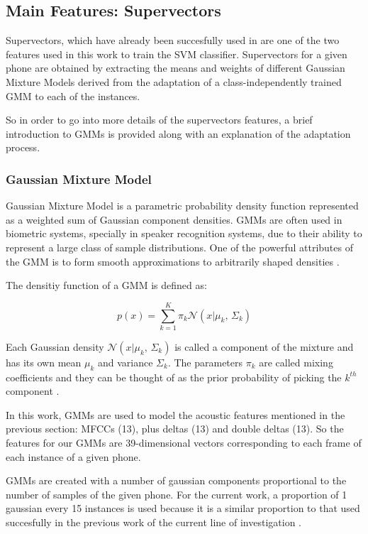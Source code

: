 \subsection{Main Features: Supervectors}

Supervectors, which have already been succesfully used in
\cite{supervectors, main} are one of the two features used in this work to train the SVM
classifier. Supervectors for a given phone are obtained by extracting the means and weights
of different
Gaussian Mixture Models derived from the adaptation of a class-independently trained GMM
to each of the instances.

So in order to go into more details of the supervectors features, a brief introduction to
GMMs is provided along with an explanation of the adaptation process.

\subsubsection{Gaussian Mixture Model}

Gaussian Mixture Model is a parametric probability density function represented as a weighted
sum of Gaussian component densities. GMMs are often used in biometric systems, specially
in speaker recognition systems, due to their ability to represent a large class of sample
distributions. One of the powerful attributes of the GMM is to form smooth approximations to
arbitrarily shaped densities \cite{gmm_reynolds}.

The densitiy function of a GMM is defined as:

\begin{equation}
  p(x) = \sum_{k=1}^{K}\pi_{k} \mathcal{N}(x|\mu_{k},\,\Sigma_{k})
\end{equation}

Each Gaussian density $\mathcal{N}(x|\mu_{k},\,\Sigma_{k})$ is called a component of the mixture
and has its own mean $\mu_{k}$ and variance $\Sigma_{k}$. The parameters $\pi_{k}$ are called
mixing coefficients and they can be thought of as the prior probability of picking the $k^{th}$
component \cite{gmm_bishop}.

In this work, GMMs are used to model the acoustic features mentioned in the previous section:
MFCCs (13), plus deltas (13) and double deltas (13). So the features for our GMMs are
39-dimensional vectors corresponding to each frame of each instance of a given phone.

GMMs are created with a number of gaussian components proportional to the number of samples
of the given phone. For the current work, a proportion of 1 gaussian every 15 instances is used
because it is a similar proportion to that used succesfully in the previous work
of the current line of investigation \cite{main}.

